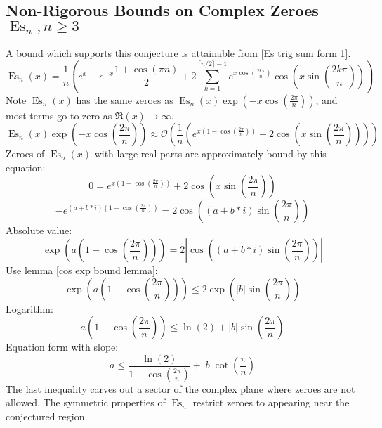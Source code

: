 \documentclass[]{article}
\DeclareMathOperator{\es}{Es}
\newcommand{\pqty}[1]{{\left(#1\right)}}
\newcommand{\abs}[1]{{\left\lvert#1\right\rvert}}
\begin{document}
	
	\subsection{Non-Rigorous Bounds on Complex Zeroes \(\es_n, n\geq 3\)}
	A bound which supports this conjecture is attainable from \eqref{Es trig sum form 1}.
	\begin{equation}
	\es_n\pqty{x}
	=
	\frac{1}{n}\pqty{
		e^x+e^{-x}\frac{1+\cos\pqty{\pi n}}{2} 
		+2\sum _{k=1}^{\lceil n/2\rceil-1}e^{x\cos\pqty{\frac{2k\pi}{n}}} \cos\pqty{x\sin\pqty{\frac{2k\pi}{n}}}
	}
	\end{equation}
	Note \(\es_n\pqty{x}\) has the same zeroes as \(\es_n\pqty{x}\exp\pqty{-x\cos\pqty{\frac{2\pi}{n}}}\), and most terms go to zero as \(\Re\pqty{x}\to\infty\).
	\begin{equation}
	\es_n\pqty{x}\exp\pqty{-x\cos\pqty{\frac{2\pi}{n}}}
	\approx\mathcal{O}\pqty{
	\frac{1}{n}\pqty{
		e^{x\pqty{1-\cos\pqty{\frac{2\pi}{n}}}}
		+2 \cos\pqty{x\sin\pqty{\frac{2\pi}{n}}}}
	}
	\end{equation}
	Zeroes of \(\es_n\pqty{x}\) with large real parts are approximately bound by this equation:
	\begin{equation}
		0=
		e^{x\pqty{1-\cos\pqty{\frac{2\pi}{n}}}}
		+2 \cos\pqty{x\sin\pqty{\frac{2\pi}{n}}}
	\end{equation}
	\begin{equation}
	-
	e^{\pqty{a+b*i}\pqty{1-\cos\pqty{\frac{2\pi}{n}}}}=
	2 \cos\pqty{\pqty{a+b*i}\sin\pqty{\frac{2\pi}{n}}}
	\end{equation}
	Absolute value:
	\begin{equation}
	\exp\pqty{a\pqty{1-\cos\pqty{\frac{2\pi}{n}}}}=
	2 \abs{\cos\pqty{\pqty{a+b*i}\sin\pqty{\frac{2\pi}{n}}}}
	\end{equation}
	Use lemma \eqref{cos exp bound lemma}:
	\begin{equation}
	\exp\pqty{a\pqty{1-\cos\pqty{\frac{2\pi}{n}}}}\leq
	2 \exp\pqty{\abs{b}\sin\pqty{\frac{2\pi}{n}}}
	\end{equation}
	Logarithm:
	\begin{equation}
	{a\pqty{1-\cos\pqty{\frac{2\pi}{n}}}}\leq
	\ln\pqty{2} + {\abs{b}\sin\pqty{\frac{2\pi}{n}}}
	\end{equation}
	Equation form with slope:
	\begin{equation}
	{a\leq
	\frac{\ln\pqty{2}}{{1-\cos\pqty{\frac{2\pi}{n}}}}} + {\abs{b}\cot\pqty{\frac{\pi}{n}}}
	\end{equation}
	The last inequality carves out a sector of the complex plane where zeroes are not allowed. The symmetric properties of \(\es_n\) restrict zeroes to appearing near the conjectured region.
	
\end{document}
